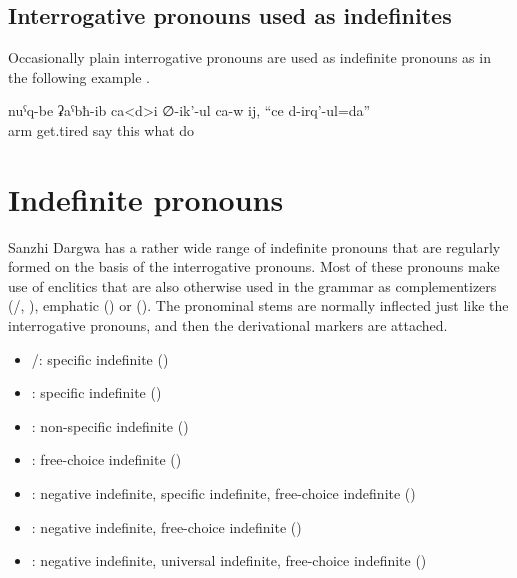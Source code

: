 \subsection{Interrogative pronouns used as indefinites}
\label{ssec:Interrogative pronouns as indefinites}

Occasionally plain interrogative pronouns are used as indefinite pronouns as in the following example .

\begin{exe}
	\ex	\label{ex:He says, my hands got tired, I do something}
	\gll	nuˁq-be	ʡaˁbħ-ib ca<d>i	∅-ik'-ul ca-w	ij,	``ce	d-irq'-ul=da''\\
		arm	get.tired 	say 	this	what	do\\
	\glt	{}
\end{exe}



\section{Indefinite pronouns}
\label{sec:Indefinite pronouns}

Sanzhi Dargwa has a rather wide range of indefinite pronouns that are regularly formed on the basis of the interrogative pronouns. Most of these pronouns make use of enclitics that are also otherwise used in the grammar as complementizers (\slash{}, ), emphatic  () or  (). The pronominal stems are normally inflected just like the interrogative pronouns, and then the derivational markers are attached.

\begin{itemize}
	\item	{}\slash{}: specific indefinite ()
		\item	{}: specific indefinite ()
	\item	{}: non-specific indefinite ()
	\item	{}: free-choice indefinite ()
	\item	{}: negative indefinite, specific indefinite, free-choice indefinite ()
		\item	{}: negative indefinite, free-choice indefinite ()
	\item	{}: negative indefinite, universal indefinite, free-choice indefinite ()
\end{itemize}

